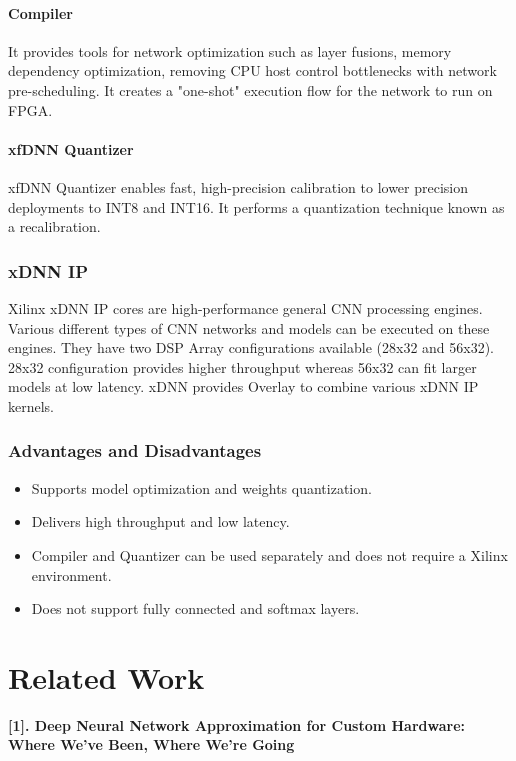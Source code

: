\documentclass[titlepage]{report}
\begin{document}
\begin{itemize}
\subsubsection{Compiler}

It provides tools for network optimization such as layer fusions, memory dependency optimization, removing CPU host control bottlenecks with network pre-scheduling. It creates a "one-shot" execution flow for the network to run on FPGA.

\subsubsection{xfDNN Quantizer} 

xfDNN Quantizer enables fast, high-precision calibration to lower precision deployments to INT8 and INT16. It performs a quantization technique known as a recalibration.

\subsection{xDNN IP}
Xilinx xDNN IP cores are high-performance general CNN processing engines. Various different types of CNN networks and models can be executed on these engines. They have two DSP Array configurations available (28x32 and 56x32). 28x32 configuration provides higher throughput whereas 56x32 can fit larger models at low latency.
xDNN provides Overlay to combine various xDNN IP kernels.

\subsection{Advantages and Disadvantages}
  
 \begin{itemize}
 \item Supports model optimization and weights quantization.
 \item Delivers high throughput and low latency.
 \item Compiler and Quantizer can be used separately and does not require a Xilinx environment.
 \item Does not support fully connected and softmax layers.
 
 \end{itemize}




\chapter{Related Work}
\textbf {[1]. Deep Neural Network Approximation for Custom Hardware: Where We've Been, Where We're Going} 


\end{itemize}
\end{document}
